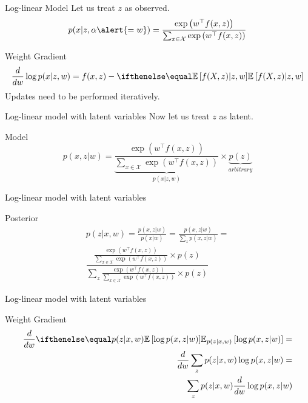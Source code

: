 \documentclass[14pt]{beamer}
\begin{document}
\begin{frame}{Log-linear Model}
Let us treat $ z $ as observed.
\begin{equation*}
p(x|z,\alpha\alert{=w}) = \frac{\exp\left(w^{\top}f(x,z)\right)}{\sum_{x\in \mathcal{X}}\exp\left(w^{\top}f(x,z)\right)}
\end{equation*}
\pause
\begin{block}{Weight Gradient}
\begin{equation*}
\frac{d}{dw}\log p(x|z,w) = f(x,z) - \E{f(X,z)|z,w} 
\end{equation*}
\pause
Updates need to be performed iteratively.
\end{block}
\end{frame}

\begin{frame}{Log-linear model with latent variables}
Now let us treat $ z $ as latent.
\pause
\begin{block}{Model}
\begin{equation*}
p(x,z|w) = \underbrace{\frac{\exp\left(w^{\top}f(x,z)\right)}{\sum_{x\in \mathcal{X}}\exp\left(w^{\top}f(x,z)\right)}}_{p(x|z, w)} 
\times \underbrace{p(z)}_{arbitrary}
\end{equation*}
\end{block}
\end{frame}

\begin{frame}{Log-linear model with latent variables}
\begin{block}{Posterior}
\begin{align*}
p(z|x,w) = \frac{p(x,z|w)}{p(x|w)} = \frac{p(x,z|w)}{\sum_{z} p(x,z|w)} = \\
\dfrac{\frac{\exp\left(w^{\top}f(x,z)\right)}{\sum_{x\in \mathcal{X}}\exp\left(w^{\top}f(x,z)\right)} \times p(z)}
{\sum_{z} \frac{\exp\left(w^{\top}f(x,z)\right)}{\sum_{x\in \mathcal{X}}\exp\left(w^{\top}f(x,z)\right)} \times p(z)}
\end{align*}
\end{block}
\end{frame}

\begin{frame}{Log-linear model with latent variables}
\begin{block}{Weight Gradient}
\begin{align*}
\frac{d}{dw}\E[p(z|x,w)]{\log p(x,z|w)} = \\ 
\frac{d}{dw}\sum_{z}p(z|x,w) \log p(x,z|w) = \\
\sum_{z}p(z|x,w)  \frac{d}{dw}\log p(x,z|w)
\end{align*}
\end{block}
\end{frame}
\end{document}
